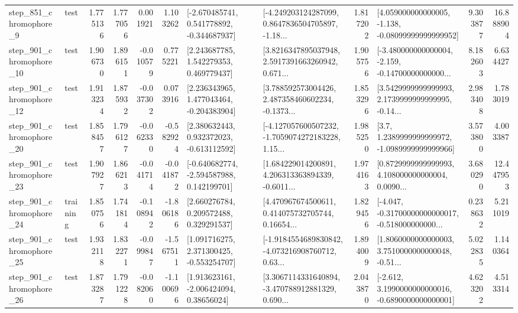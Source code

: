\begin{tabular}{llrrrrllrlrr}
   step\_851\_chromophore\_9 &      test &      1.775136 &    1.777056 &      0.001921 &  1.103262 &   [-2.670485741, 0.541778892, -0.344687937] &  [-4.249203124287099, 0.8647836504705897, -1.18... &       1.817202 &  [4.059000000000005, -1.138, -0.08099999999999952] &            9.303877 &         16.888904 \\
  step\_901\_chromophore\_10 &      test &      1.906730 &    1.896151 &     -0.010579 &  0.775221 &     [2.243687785, 1.542279353, 0.469779437] &  [3.8216347895037948, 2.5917391663260942, 0.671... &       1.905756 &  [-3.480000000000004, -2.159, -0.14700000000000... &            8.182603 &          6.634427 \\
  step\_901\_chromophore\_12 &      test &      1.913234 &    1.875932 &     -0.037302 &  0.073916 &    [2.236343965, 1.477043464, -0.204383904] &  [3.788592573004426, 2.487358460602234, -0.1373... &       1.853296 &  [3.5429999999999993, 2.1739999999999995, -0.14... &            2.983408 &          1.783019 \\
  step\_901\_chromophore\_20 &      test &      1.858457 &    1.796127 &     -0.062330 & -0.582924 &    [2.380632443, 0.932372023, -0.613112592] &  [-4.127057600507232, -1.7059074272183228, 1.15... &       1.985250 &     [3.7, 1.2389999999999972, -1.0989999999999966] &            3.573800 &          4.003387 \\
  step\_901\_chromophore\_23 &      test &      1.907927 &    1.866213 &     -0.041714 & -0.041872 &   [-0.640682774, -2.594587988, 0.142199701] &  [1.684229014200891, 4.206313363894339, -0.6011... &       1.974163 &  [0.8729999999999993, 4.108000000000004, 0.0090... &            3.680290 &         12.447953 \\
  step\_901\_chromophore\_24 &  training &      1.850756 &    1.741814 &     -0.108942 & -1.806186 &     [2.660276784, 0.209572488, 0.329291537] &  [4.470967674500611, 0.414075732705744, 0.16654... &       1.829456 &  [-4.047, -0.31700000000000017, -0.518000000000... &            0.238632 &          5.211019 \\
  step\_901\_chromophore\_25 &      test &      1.932118 &    1.832271 &     -0.099847 & -1.567511 &    [1.091716275, 2.371300425, -0.553254707] &  [-1.9184554689830842, -4.073216908760712, 0.63... &       1.894009 &  [1.8060000000000003, 3.7510000000000048, -0.51... &            5.022835 &          1.140364 \\
  step\_901\_chromophore\_26 &      test &      1.873287 &    1.791228 &     -0.082060 & -1.100696 &     [1.913623161, -2.006424094, 0.38656024] &  [3.3067114331640894, -3.470788912881329, 0.690... &       2.043870 &  [-2.612, 3.1990000000000016, -0.6890000000000001] &            4.623202 &          4.513314 \\

\end{tabular}
